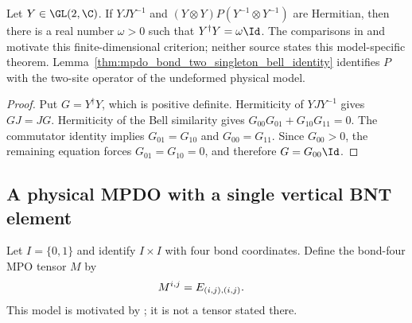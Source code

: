 \begin{lemma}%
    \label{thm:mpdo_bond_two_singleton_scalar_gram}
    \leanok
    Let $Y\in\GL(2,\C)$. If $YJY^{-1}$ and
    $(Y\otimes Y)P(Y^{-1}\otimes Y^{-1})$ are Hermitian, then there is a
    real number $\omega>0$ such that $Y^\dagger Y=\omega\Id$.
    The comparisons in
    \cite[Appendix~C.4, lines~2048--2057]{Cirac2016MPDO_arXiv} and
    \cite[Proposition~4.13]{Cirac2016MPDO_arXiv} motivate this
    finite-dimensional criterion; neither source states this model-specific
    theorem. Lemma~\ref{thm:mpdo_bond_two_singleton_bell_identity} identifies
    $P$ with the two-site operator of the undeformed physical model.
\end{lemma}

\begin{proof}\leanok
    Put $G=Y^\dagger Y$, which is positive definite. Hermiticity of
    $YJY^{-1}$ gives $GJ=JG$. Hermiticity of the Bell similarity gives
    $G_{00}G_{01}+G_{10}G_{11}=0$. The commutator identity implies
    $G_{01}=G_{10}$ and $G_{00}=G_{11}$. Since $G_{00}>0$, the remaining
    equation forces $G_{01}=G_{10}=0$, and therefore $G=G_{00}\Id$.
\end{proof}

\subsection{A physical MPDO with a single vertical BNT element}

\begin{definition}%
    \label{def:mpdo_bond_two_singleton_base_mpo}
    \leanok
    Let $I=\{0,1\}$ and identify $I\times I$ with four bond coordinates.
    Define the bond-four MPO tensor $M$ by
    \begin{align}
        M^{i,j} & =E_{(i,j),(i,j)}.
        \notag
    \end{align}
    This model is motivated by
    \cite[Appendix~C.4, lines~2048--2057]{Cirac2016MPDO_arXiv}; it is not a
    tensor stated there.
\end{definition}

